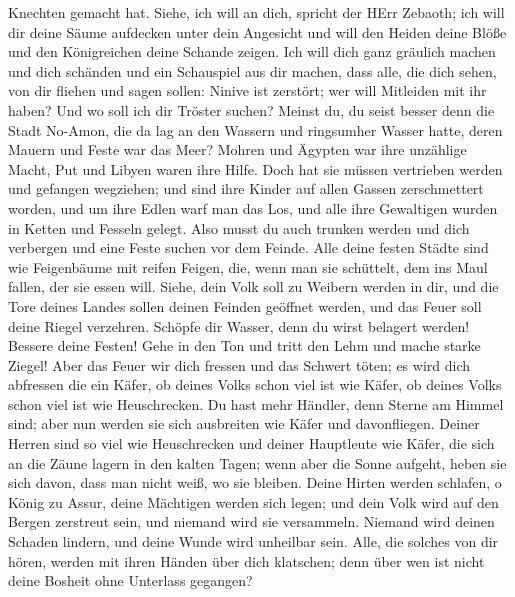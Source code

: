 Knechten gemacht hat.  Siehe, ich will an dich, spricht der
HErr Zebaoth; ich will dir deine Säume aufdecken unter dein Angesicht
und will den Heiden deine Blöße und den Königreichen deine Schande
zeigen.  Ich will dich ganz gräulich machen und dich
schänden und ein Schauspiel aus dir machen,  dass alle, die
dich sehen, von dir fliehen und sagen sollen: Ninive ist zerstört; wer
will Mitleiden mit ihr haben? Und wo soll ich dir Tröster suchen?
 Meinst du, du seist besser denn die Stadt No-Amon, die da
lag an den Wassern und ringsumher Wasser hatte, deren Mauern und Feste
war das Meer?  Mohren und Ägypten war ihre unzählige Macht,
Put und Libyen waren ihre Hilfe.  Doch hat sie müssen
vertrieben werden und gefangen wegziehen; und sind ihre Kinder auf allen
Gassen zerschmettert worden, und um ihre Edlen warf man das Los, und
alle ihre Gewaltigen wurden in Ketten und Fesseln gelegt. 
Also musst du auch trunken werden und dich verbergen und eine Feste
suchen vor dem Feinde.  Alle deine festen Städte sind wie
Feigenbäume mit reifen Feigen, die, wenn man sie schüttelt, dem ins Maul
fallen, der sie essen will.  Siehe, dein Volk soll zu
Weibern werden in dir, und die Tore deines Landes sollen deinen Feinden
geöffnet werden, und das Feuer soll deine Riegel verzehren.
 Schöpfe dir Wasser, denn du wirst belagert werden! Bessere
deine Festen! Gehe in den Ton und tritt den Lehm und mache starke
Ziegel!  Aber das Feuer wir dich fressen und das Schwert
töten; es wird dich abfressen die ein Käfer, ob deines Volks schon viel
ist wie Käfer, ob deines Volks schon viel ist wie Heuschrecken.
 Du hast mehr Händler, denn Sterne am Himmel sind; aber nun
werden sie sich ausbreiten wie Käfer und davonfliegen. 
Deiner Herren sind so viel wie Heuschrecken und deiner Hauptleute wie
Käfer, die sich an die Zäune lagern in den kalten Tagen; wenn aber die
Sonne aufgeht, heben sie sich davon, dass man nicht weiß, wo sie
bleiben.  Deine Hirten werden schlafen, o König zu Assur,
deine Mächtigen werden sich legen; und dein Volk wird auf den Bergen
zerstreut sein, und niemand wird sie versammeln.  Niemand
wird deinen Schaden lindern, und deine Wunde wird unheilbar sein. Alle,
die solches von dir hören, werden mit ihren Händen über dich klatschen;
denn über wen ist nicht deine Bosheit ohne Unterlass gegangen?
